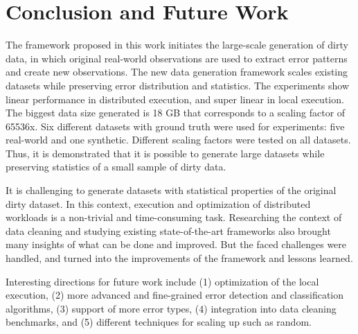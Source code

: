 \chapter{Conclusion and Future Work}
The framework proposed in this work initiates the large-scale generation of dirty data, in which original real-world observations are used to extract error patterns and create new observations.
The new data generation framework scales existing datasets while preserving error distribution and statistics.
The experiments show linear performance in distributed execution, and super linear in local execution.
The biggest data size generated is 18 GB that corresponds to a scaling factor of 65536x.
Six different datasets with ground truth were used for experiments: five real-world and one synthetic.
Different scaling factors were tested on all datasets.
Thus, it is demonstrated that it is possible to generate large datasets while preserving statistics of a small sample of dirty data.

It is challenging to generate datasets with statistical properties of the original dirty dataset.
In this context, execution and optimization of distributed workloads is a non-trivial and time-consuming task.
Researching the context of data cleaning and studying existing state-of-the-art frameworks also brought many insights of what can be done and improved.
But the faced challenges were handled, and turned into the improvements of the framework and lessons learned.

Interesting directions for future work include 
(1) optimization of the local execution, 
(2) more advanced and fine-grained error detection and classification algorithms,
(3) support of more error types, 
(4) integration into data cleaning benchmarks, and
(5) different techniques for scaling up such as random.


